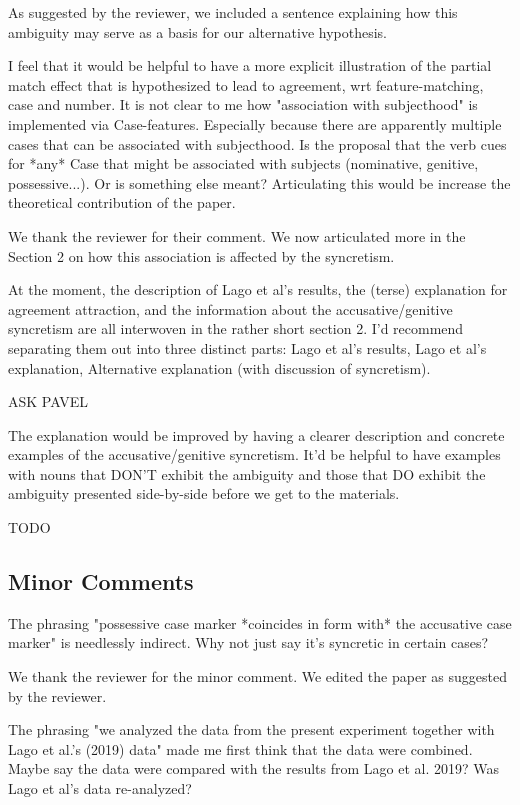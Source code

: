 \documentclass{response}
\begin{document}
\AR As suggested by the reviewer, we included a sentence explaining how this ambiguity may serve as a basis for our alternative hypothesis.

\RC I feel that it would be helpful to have a more explicit illustration of the partial match effect that is hypothesized to lead to agreement, wrt feature-matching, case and number. It is not clear to me how "association with subjecthood" is implemented via Case-features. Especially because there are apparently multiple cases that can be associated with subjecthood. Is the proposal that the verb cues for *any* Case that might be associated with subjects (nominative, genitive, possessive...). Or is something else meant? Articulating this would be increase the theoretical contribution of the paper. 

\AR We thank the reviewer for their comment. We now articulated more in the Section 2 on how this association is affected by the syncretism.

\RC At the moment, the description of Lago et al's results, the (terse) explanation for agreement attraction, and the information about the accusative/genitive syncretism are all interwoven in the rather short section 2. I'd recommend separating them out into three distinct parts: Lago et al's results, Lago et al's explanation, Alternative explanation (with discussion of syncretism). 

\AR ASK PAVEL

\RC The explanation would be improved by having a clearer description and concrete examples of the accusative/genitive syncretism. It'd be helpful to have examples with nouns that DON'T exhibit the ambiguity and those that DO exhibit the ambiguity presented side-by-side before we get to the materials. 

\AR TODO

\subsection{Minor Comments}

\RC The phrasing "possessive case marker *coincides in form with* the accusative case marker" is needlessly indirect. Why not just say it's syncretic in certain cases?

\AR We thank the reviewer for the minor comment. We edited the paper as suggested by the reviewer.

\RC The phrasing "we analyzed the data from the present experiment together with Lago et al.’s (2019) data" made me first think that the data were combined. Maybe say the data were compared with the results from Lago et al. 2019? Was Lago et al's data re-analyzed?
\end{document}
